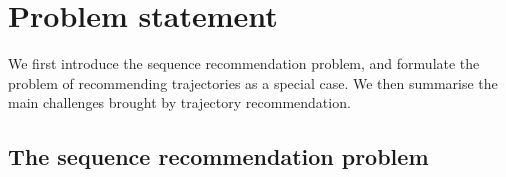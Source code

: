

\section{Problem statement}


We first introduce the sequence recommendation problem,
and formulate the problem of recommending trajectories as a special case.
We then summarise the main challenges brought by trajectory recommendation.


\subsection{The sequence recommendation problem}

